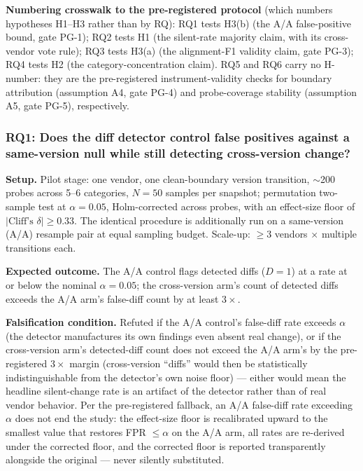 \documentclass[11pt]{article}
\begin{document}
\noindent\textbf{Numbering crosswalk to the pre-registered protocol} (which numbers hypotheses H1--H3 rather than by RQ): RQ1 tests H3(b) (the A/A false-positive bound, gate PG-1); RQ2 tests H1 (the silent-rate majority claim, with its cross-vendor vote rule); RQ3 tests H3(a) (the alignment-F1 validity claim, gate PG-3); RQ4 tests H2 (the category-concentration claim). RQ5 and RQ6 carry no H-number: they are the pre-registered instrument-validity checks for boundary attribution (assumption A4, gate PG-4) and probe-coverage stability (assumption A5, gate PG-5), respectively.

\subsubsection{RQ1: Does the diff detector control false positives against a same-version null while still detecting cross-version change?}
\textbf{Setup.} Pilot stage: one vendor, one clean-boundary version transition, $\sim$200 probes across 5--6 categories, $N=50$ samples per snapshot; permutation two-sample test at $\alpha=0.05$, Holm-corrected across probes, with an effect-size floor of $|\text{Cliff's } \delta| \ge 0.33$. The identical procedure is additionally run on a same-version (A/A) resample pair at equal sampling budget. Scale-up: $\geq 3$ vendors $\times$ multiple transitions each.

\textbf{Expected outcome.} The A/A control flags detected diffs ($D=1$) at a rate at or below the nominal $\alpha=0.05$; the cross-version arm's count of detected diffs exceeds the A/A arm's false-diff count by at least $3\times$.

\textbf{Falsification condition.} Refuted if the A/A control's false-diff rate exceeds $\alpha$ (the detector manufactures its own findings even absent real change), or if the cross-version arm's detected-diff count does not exceed the A/A arm's by the pre-registered $3\times$ margin (cross-version ``diffs'' would then be statistically indistinguishable from the detector's own noise floor) --- either would mean the headline silent-change rate is an artifact of the detector rather than of real vendor behavior. Per the pre-registered fallback, an A/A false-diff rate exceeding $\alpha$ does not end the study: the effect-size floor is recalibrated upward to the smallest value that restores FPR $\le \alpha$ on the A/A arm, all rates are re-derived under the corrected floor, and the corrected floor is reported transparently alongside the original --- never silently substituted.
\end{document}
